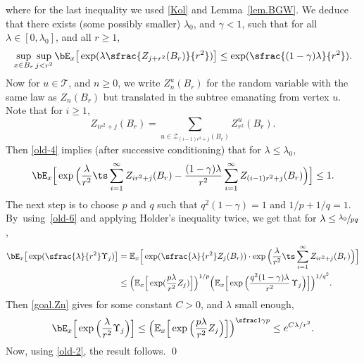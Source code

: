 where for the last inequality we used \eqref{Kol} and Lemma~\ref{lem.BGW}.
We deduce that there exists (some possibly smaller) $\lambda_0$, and $\gamma<1$, such that for
all $\lambda\in[0,\lambda_0]$, and all $r\ge 1$,
\begin{equation}\label{old-4}
\sup_{x\in B_r}\sup_{j<r^2}
\bE_x\big[\exp(\lambda \sfrac{Z_{j+r^2}(B_r)}{r^2})\big]
\le \exp(\sfrac{(1-\gamma)\lambda}{r^2}).
\end{equation}
Now for $u\in \mathcal T$, and $n\ge 0$, we write $Z^u_n(B_r)$ for the random variable with the same law as $Z_n(B_r)$ but translated in the subtree emanating from vertex $u$.
Note that for $i\ge 1$,
\begin{equation*}
Z_{ir^2+j}(B_r)=\sum_{u\in \mathcal Z_{(i-1)r^2+j}(B_r) }
Z^u_{r^2}(B_r).
\end{equation*}
Then \eqref{old-4} implies (after successive conditioning) that for $\lambda\le \lambda_0$,
\begin{equation}\label{old-6}
\bE_x\Big[\exp\Big(\frac{\lambda}{r^2}
\ts\sum_{i=1}^\infty Z_{i r^2+j}(B_r)
-\dfrac{(1-\gamma)\lambda}{r^2}
\sum_{i=1}^\infty Z_{(i-1)r^2+j}(B_r) \Big)\Big]\le 1.
\end{equation}
The next step is to choose $p$ and $q$ such that $q^2(1-\gamma)=1$ and $1/p+1/q=1$.
By~using~\eqref{old-6} and applying Holder's inequality twice, we get that for $\lambda \le \sfrac{\lambda_0}{pq}$,
\begin{equation*}
\begin{split}
\bE_x\big[\exp(\sfrac{\lambda}{r^2}\Upsilon_j)\big]& = \mathbb E_x\Big[\exp(
\sfrac{\lambda}{r^2} Z_j(B_r))\cdot \exp\Big(\dfrac{\lambda}{r^2}
\ts\sum_{i=1}^\infty Z_{ir^2+j}(B_r)\Big)\Big]\\
& \le \Big(\mathbb E_x\Big[\exp(\frac{p\lambda}{r^2} Z_j)\Big]\Big)^{1/p}
\Big(\mathbb E_x\Big[\exp \Big(\frac{q^2(1-\gamma)\lambda}{r^2}\,\Upsilon_j \Big)\Big]\Big)^{1/q^2}.
\end{split}
\end{equation*}
Then \eqref{goal.Zn} gives for some constant $C>0$, and $\lambda$ small enough,
\begin{equation*}
\bE_x \Big[\exp \Big(\frac{\lambda}{r^2}\Upsilon_j \Big) \Big]\le
\Big(\mathbb E_x \Big[\exp \Big(\frac{p\lambda}{r^2} Z_j \Big) \Big]\Big)^{\sfrac 1{\gamma p}}
\le e^{C \lambda/r^2}.
\end{equation*}
Now, using \eqref{old-2}, the result follows. \qed

